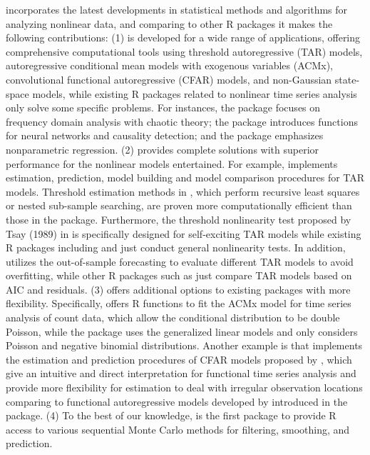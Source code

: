  incorporates
the latest developments in statistical methods and algorithms for analyzing nonlinear data, and comparing to other R packages it makes the following contributions: (1)  is developed for a wide range of applications, offering comprehensive computational tools using threshold autoregressive (TAR) models, autoregressive conditional mean models with exogenous variables (ACMx), convolutional functional autoregressive (CFAR) models, and non-Gaussian state-space models, while existing R packages related to nonlinear time series analysis only solve some specific problems. For instances, the  package focuses on frequency domain analysis with chaotic theory; the  package introduces functions for neural networks and causality detection; and the  package emphasizes nonparametric regression.
(2)  provides complete solutions with superior performance for the nonlinear models entertained. For example,  implements estimation, prediction, model building and model comparison procedures for TAR models. Threshold estimation methods in , which perform recursive least squares or nested sub-sample searching, are proven more computationally efficient than those in the  package. Furthermore, the threshold nonlinearity test proposed by Tsay (1989) in  is specifically designed for self-exciting TAR models while existing R packages including  and  just conduct general nonlinearity tests. In addition,  utilizes the out-of-sample forecasting to evaluate different TAR models to avoid overfitting, while other R packages such as  just compare TAR models based on AIC and residuals. (3)  offers additional options to existing packages with more flexibility. Specifically,  offers R functions to fit the ACMx model for time series analysis of count data, which allow the conditional distribution to be double Poisson, while the  package uses the generalized linear models and only considers Poisson and negative binomial distributions. Another example is that  implements the estimation and prediction procedures of CFAR models proposed by \cite{liu2016functional}, which give an intuitive and direct interpretation for functional time series analysis and provide more flexibility for estimation to deal with irregular observation locations comparing to functional autoregressive models developed by \cite{bosq2000} introduced in the  package. (4) To the best of our knowledge,  is the first package to provide R access to various sequential Monte Carlo methods for filtering, smoothing, and prediction.

